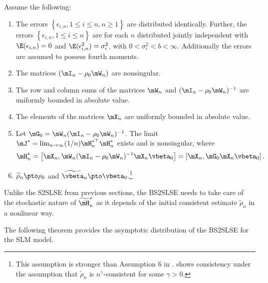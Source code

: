 \documentclass[english,12pt]{book}\usepackage[]{graphicx}\usepackage[]{xcolor}
\begin{document}
\begin{assumption}\label{assumption:lee-2003}
Assume the following:
\begin{enumerate}
\item The errors  $\left\lbrace \epsilon_{i,n}, 1 \leq i \leq n, n\geq 1\right\rbrace$ are distributed identically. Further, the errors $\left\lbrace \epsilon_{i,n}, 1 \leq i \leq n\right\rbrace$ are for each $n$ distributed jointly independent with  $\E(\epsilon_{i,n})= 0$ and $\E(\epsilon_{i,n}^2) = \sigma^2_{\epsilon}$, with $0 < \sigma^2_{\epsilon}  < b <\infty$. Additionally the errors are assumed to possess fourth moments.
  \item The matrices $(\mI_n - \rho_0\mW_n)$ are nonsingular. 
  \item The row and column sums of the matrices $\mW_n$ and $(\mI_n - \rho_0\mW_n)^{-1}$ are uniformly bounded in absolute value. 
  \item The elements of the matrices $\mX_n$ are uniformly bounded in absolute value. 
  \item Let $\mG_0 = \mW_n(\mI_n - \rho_0\mW_n)^{-1}$. The limit $\mJ^* = \lim_{n \to \infty}(1/n)\mH_n^{*\top}\mH_n^{*}$ exists and is nonsingular, where
  \begin{equation*}
    \mH_n^* = \left[\mX_n, \mW_n(\mI_n - \rho_0\mW_n)^{-1}\mX_n\vbeta_0\right] = \left[\mX_n, \mG_0\mX_n\vbeta_0\right].
  \end{equation*}
  \item $\widetilde{\rho}_n\pto \rho_0$ and $\widetilde{\vbeta}_n \pto \vbeta_0$.\footnote{This assumption is stronger than Assumption 6 in \cite{lee2003best}. \cite{lee2003best} shows consistency under the assumption that $\widetilde{\rho}_n$ is $n^\gamma$-consistent for some $\gamma>0$.}
\end{enumerate}  
\end{assumption}

Unlike the S2SLSE from previous sections, the BS2SLSE needs to take care of the stochastic nature of $\widetilde{\mH}^{*}_n$ as it depends of the initial consistent estimate $\widetilde{\rho}_n$ in a nonlinear way. 

The following theorem provides the asymptotic distribution of the BS2SLSE for the SLM model. 
\end{document}

